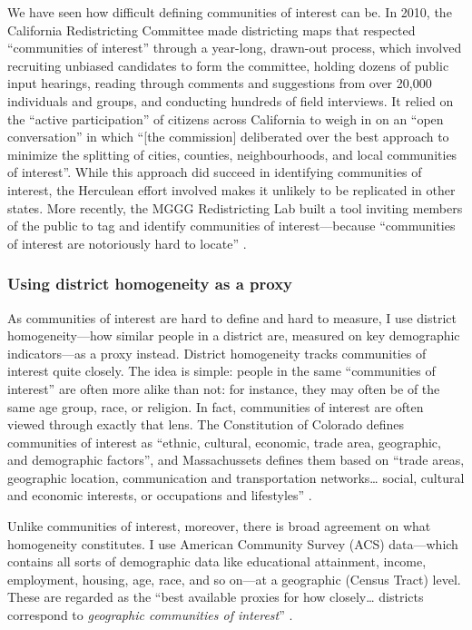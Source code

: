 \documentclass[]{article}
\begin{document}
We have seen how difficult defining communities of interest can be. In
2010, the California Redistricting Committee made districting maps that
respected ``communities of interest'' through a year-long, drawn-out
process, which involved recruiting unbiased candidates to form the
committee, holding dozens of public input hearings, reading through
comments and suggestions from over 20,000 individuals and groups, and
conducting hundreds of field interviews. It relied on the ``active
participation'' of citizens across California to weigh in on an ``open
conversation'' in which ``{[}the commission{]} deliberated over the best
approach to minimize the splitting of cities, counties, neighbourhoods,
and local communities of interest''. While this approach did succeed in
identifying communities of interest, the Herculean effort involved makes
it unlikely to be replicated in other states. More recently, the MGGG
Redistricting Lab built a tool inviting members of the public to tag and
identify communities of interest---because ``communities of interest are
notoriously hard to locate'' \citep{mggg2020}.

\hypertarget{using-district-homogeneity-as-a-proxy}{%
\subsubsection{Using district homogeneity as a
proxy}\label{using-district-homogeneity-as-a-proxy}}

As communities of interest are hard to define and hard to measure, I use
district homogeneity---how similar people in a district are, measured on
key demographic indicators---as a proxy instead. District homogeneity
tracks communities of interest quite closely. The idea is simple: people
in the same ``communities of interest'' are often more alike than not:
for instance, they may often be of the same age group, race, or
religion. In fact, communities of interest are often viewed through
exactly that lens. The Constitution of Colorado defines communities of
interest as ``ethnic, cultural, economic, trade area, geographic, and
demographic factors'', and Massachussets defines them based on ``trade
areas, geographic location, communication and transportation
networks\ldots{} social, cultural and economic interests, or occupations
and lifestyles'' \citep{brennan}.

Unlike communities of interest, moreover, there is broad agreement on
what homogeneity constitutes. I use American Community Survey (ACS)
data---which contains all sorts of demographic data like educational
attainment, income, employment, housing, age, race, and so on---at a
geographic (Census Tract) level. These are regarded as the ``best
available proxies for how closely\ldots{} districts correspond to
\emph{geographic communities of interest}'' \citet[p.~283]{steph2012}.
\end{document}
